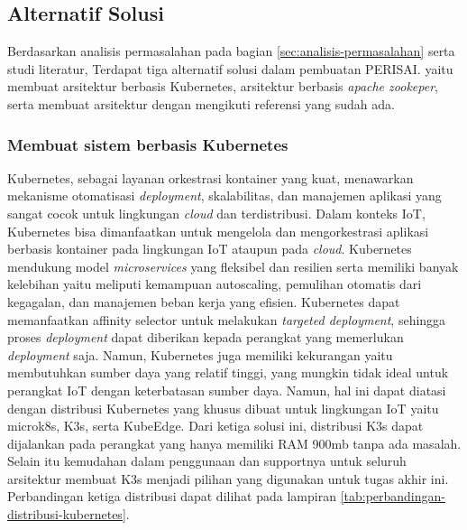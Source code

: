 \subsection{Alternatif Solusi}
\label{sec:analisis-solusi}

Berdasarkan analisis permasalahan pada bagian \ref{sec:analisis-permasalahan} serta studi literatur, Terdapat tiga alternatif solusi dalam pembuatan PERISAI. yaitu membuat arsitektur berbasis Kubernetes, arsitektur berbasis \textit{apache zookeper}, serta membuat arsitektur dengan mengikuti referensi yang sudah ada.

\subsubsection{Membuat sistem berbasis Kubernetes}
Kubernetes, sebagai layanan orkestrasi kontainer yang kuat, menawarkan mekanisme otomatisasi \textit{deployment}, skalabilitas, dan manajemen aplikasi yang sangat cocok untuk lingkungan \textit{cloud} dan terdistribusi. Dalam konteks IoT, Kubernetes bisa dimanfaatkan untuk mengelola dan mengorkestrasi aplikasi berbasis kontainer pada lingkungan IoT ataupun pada \textit{cloud}. Kubernetes mendukung model \textit{microservices} yang fleksibel dan resilien serta memiliki banyak kelebihan yaitu meliputi kemampuan autoscaling, pemulihan otomatis dari kegagalan, dan manajemen beban kerja yang efisien. Kubernetes dapat memanfaatkan affinity selector untuk melakukan \textit{targeted deployment}, sehingga proses \textit{deployment} dapat diberikan kepada perangkat yang memerlukan \textit{deployment} saja. Namun, Kubernetes juga memiliki kekurangan yaitu membutuhkan sumber daya yang relatif tinggi, yang mungkin tidak ideal untuk perangkat IoT dengan keterbatasan sumber daya. Namun, hal ini dapat diatasi dengan distribusi Kubernetes yang khusus dibuat untuk lingkungan IoT yaitu microk8s, K3s, serta KubeEdge. Dari ketiga solusi ini, distribusi K3s dapat dijalankan pada perangkat yang hanya memiliki RAM 900mb tanpa ada masalah. Selain itu kemudahan dalam penggunaan dan supportnya untuk seluruh arsitektur membuat K3s menjadi pilihan yang digunakan untuk tugas akhir ini. Perbandingan ketiga distribusi dapat dilihat pada lampiran \ref{tab:perbandingan-distribusi-kubernetes}.

